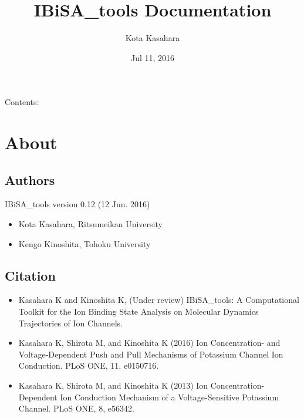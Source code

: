 \documentclass[letterpaper,10pt,english]{sphinxmanual}
\title{IBiSA\_tools Documentation}
\date{Jul 11, 2016}
\author{Kota Kasahara}
\begin{document}
\maketitle
\tableofcontents
{}\label{index::doc}


Contents:


\chapter{About}
\label{about:about}\label{about::doc}\label{about:welcome-to-ibisa-tools-s-documentation}

\section{Authors}
\label{about:authors}
IBiSA\_tools version 0.12 (12 Jun. 2016)
\begin{itemize}
\item {} 
Kota Kasahara, Ritsumeikan University

\item {} 
Kengo Kinoshita, Tohoku University

\end{itemize}


\section{Citation}
\label{about:citation}\begin{itemize}
\item {} 
Kasahara K and Kinoshita K, (Under review) IBiSA\_tools: A Computational Toolkit for the Ion Binding State Analysis on Molecular Dynamics Trajectories of Ion Channels.

\item {} 
Kasahara K, Shirota M, and Kinoshita K (2016) Ion Concentration- and Voltage-Dependent Push and Pull Mechanisms of Potassium Channel Ion Conduction. PLoS ONE, 11, e0150716.

\item {} 
Kasahara K, Shirota M, and Kinoshita K (2013) Ion Concentration-Dependent Ion Conduction Mechanism of a Voltage-Sensitive Potassium Channel. PLoS ONE, 8, e56342.

\end{itemize}
\end{document}
